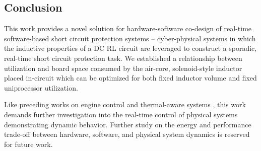 \clearpage \subsection{Conclusion} \label{subsec:conclusion}
This work provides a novel solution for hardware-software co-design of real-time\\
software-based short circuit protection systems -- cyber-physical systems in which the inductive properties of a DC RL circuit are leveraged to construct a sporadic, real-time short circuit protection task.
We established a relationship between utilization and board space consumed by the air-core, solenoid-style inductor placed in-circuit which can be optimized for both fixed inductor volume and fixed uniprocessor utilization.

Like preceding works on engine control \cite{biondi_engine_2015} and thermal-aware systems \cite{hettiarachchi_design_2014}, this work demands further investigation into the real-time control of physical systems demonstrating dynamic behavior.
Further study on the energy and performance trade-off between hardware, software, and physical system dynamics is reserved for future work.









